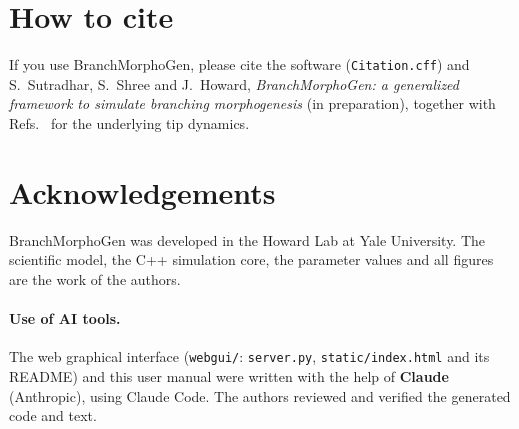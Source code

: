 \documentclass[11pt,a4paper]{article}
\newcommand{\code}[1]{\texttt{#1}}
\begin{document}
\section*{How to cite}
If you use BranchMorphoGen, please cite the software (\code{Citation.cff}) and S.~Sutradhar, S.~Shree and J.~Howard, \emph{BranchMorphoGen: a generalized framework to simulate branching morphogenesis} (in preparation), together with Refs.~\cite{Shree2022,Ouyang2025} for the underlying tip dynamics.

\section*{Acknowledgements}
BranchMorphoGen was developed in the Howard Lab at Yale University. The scientific model, the C++ simulation core, the parameter values and all figures are the work of the authors.

\paragraph{Use of AI tools.} The web graphical interface (\code{webgui/}: \code{server.py}, \code{static/index.html} and its README) and this user manual were written with the help of \textbf{Claude} (Anthropic), using Claude Code. The authors reviewed and verified the generated code and text.
\end{document}
